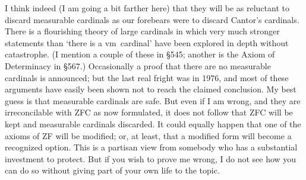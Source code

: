 {I think indeed (I am going a bit farther here) that they will be as
reluctant to discard measurable cardinals as our forebears were to
discard Cantor's cardinals.   There is a flourishing theory of large
cardinals in which very much stronger statements than `there is a \2vm\
cardinal' have been explored in depth without catastrophe.   (I
mention a couple of these in \S545;  another is the Axiom of Determinacy
in \S567.)   Occasionally a proof that
there are no measurable cardinals is announced;  but the last real
fright was in 1976, and most of these arguments have easily been shown
not to reach the claimed conclusion.   My best guess is that measurable
cardinals are safe.   But even if I am wrong, and they are
irreconcilable with ZFC as now formulated, it does not follow that ZFC
will be kept and measurable cardinals discarded.   It could equally
happen that one of the axioms of ZF will be modified;  or, at least,
that a modified form will become a recognized option.   This is a
partisan view from somebody who has a substantial investment to protect.
But if you wish to prove me wrong, I do not see how you can do so
without giving part of your own life to the topic.
}%

\discrpage

